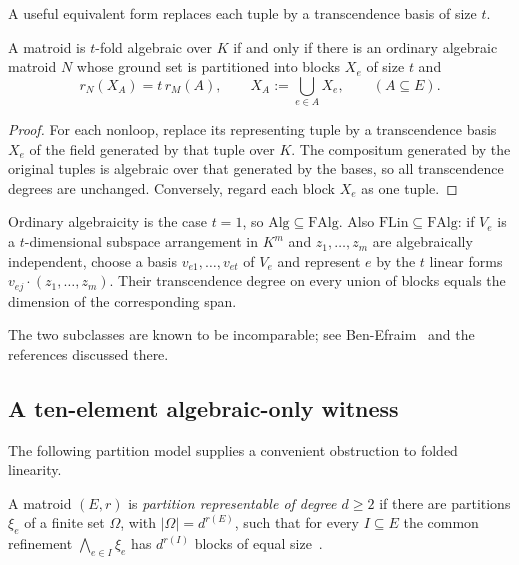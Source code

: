 \documentclass[11pt]{article}
\theoremstyle{definition}
\newcommand{\FAlg}{\mathrm{FAlg}}
\newcommand{\FLin}{\mathrm{FLin}}
\newcommand{\Alg}{\mathrm{Alg}}
\begin{document}
A useful equivalent form replaces each tuple by a transcendence basis of size $t$.

\begin{lemma}\label{lem:blocklift}
A matroid is $t$-fold algebraic over $K$ if and only if there is an ordinary algebraic matroid $N$ whose ground set is partitioned into blocks $X_e$ of size $t$ and
\[
r_N(X_A)=t\,r_M(A),
\qquad X_A:=\bigcup_{e\in A}X_e,
\qquad(A\subseteq E).
\]
\end{lemma}
\begin{proof}
For each nonloop, replace its representing tuple by a transcendence basis $X_e$ of the field generated by that tuple over $K$.  The compositum generated by the original tuples is algebraic over that generated by the bases, so all transcendence degrees are unchanged.  Conversely, regard each block $X_e$ as one tuple.
\end{proof}

Ordinary algebraicity is the case $t=1$, so $\Alg\subseteq\FAlg$.  Also $\FLin\subseteq\FAlg$: if $V_e$ is a $t$-dimensional subspace arrangement in $K^m$ and $z_1,\dots,z_m$ are algebraically independent, choose a basis $v_{e1},\dots,v_{et}$ of $V_e$ and represent $e$ by the $t$ linear forms $v_{ej}\cdot(z_1,\dots,z_m)$.  Their transcendence degree on every union of blocks equals the dimension of the corresponding span.

The two subclasses are known to be incomparable; see Ben-Efraim~\cite{BenEfraim2016} and the references discussed there.

\subsection{A ten-element algebraic-only witness}\label{subsec:mfn10}

The following partition model supplies a convenient obstruction to folded linearity.

\begin{definition}\label{def:partition}
A matroid $(E,r)$ is \emph{partition representable of degree $d\ge2$} if there are partitions $\xi_e$ of a finite set $\Omega$, with $|\Omega|=d^{r(E)}$, such that for every $I\subseteq E$ the common refinement $\bigwedge_{e\in I}\xi_e$ has $d^{r(I)}$ blocks of equal size~\cite{Matus1999}.
\end{definition}
\end{document}
